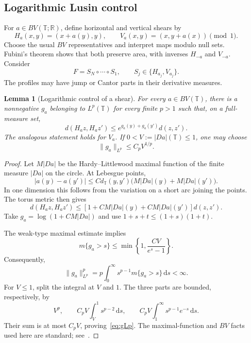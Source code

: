 \documentclass[review,12pt,times,a4paper,nopreprintline]{elsarticle}
\theoremstyle{plain}
\newtheorem{lemma}[theorem]{Lemma}
\theoremstyle{definition}
\theoremstyle{remark}
\newcommand{\T}{\mathbb T}
\newcommand{\R}{\mathbb R}
\newcommand{\dd}{\,\mathrm d}
\numberwithin{equation}{section}
\begin{document}
\subsection{Logarithmic Lusin control}
For $a\in BV(\T;\R)$, define horizontal and vertical shears by
\[
 H_a(x,y)=(x+a(y),y),\qquad
 V_a(x,y)=(x,y+a(x))\pmod1.
\]
Choose the usual $BV$ representatives and interpret maps modulo null sets. Fubini's theorem shows that both preserve area, with inverses $H_{-a}$ and $V_{-a}$. Consider
\[
 F=S_N\circ\cdots\circ S_1,\qquad
 S_j\in\{H_{a_j},V_{a_j}\}.
\]
The profiles may have jump or Cantor parts in their derivative measures.

\begin{lemma}[Logarithmic control of a shear]\label{lem:shearlusin}
For every $a\in BV(\T)$, there is a nonnegative $g_a$ belonging to $L^p(\T)$ for every finite $p>1$ such that, on a full-measure set,
\begin{equation}\label{eq:shearlusin}
 d(H_az,H_az')\leq e^{g_a(y)+g_a(y')}d(z,z').
\end{equation}
The analogous statement holds for $V_a$. If $0<V:=|Da|(\T)\leq1$, one may choose
\begin{equation}\label{eq:gLp}
 \|g_a\|_{L^p}\leq C_p V^{1/p}.
\end{equation}
\end{lemma}
\begin{proof}
Let $M|Da|$ be the Hardy--Littlewood maximal function of the finite measure $|Da|$ on the circle. At Lebesgue points,
\[
 |a(y)-a(y')|\leq C d_{\T}(y,y')
 \bigl(M|Da|(y)+M|Da|(y')\bigr).
\]
In one dimension this follows from the variation on a short arc joining the points. The torus metric then gives
\[
 d(H_az,H_az')\leq
 [1+C M|Da|(y)+C M|Da|(y')]d(z,z').
\]
Take $g_a=\log(1+C M|Da|)$ and use $1+s+t\leq(1+s)(1+t)$.

The weak-type maximal estimate implies
\begin{equation}\label{eq:gtail}
 m\{g_a>s\}\leq\min\left\{1,\frac{CV}{e^s-1}\right\}.
\end{equation}
Consequently,
\[
 \|g_a\|_{L^p}^p
 =p\int_0^\infty s^{p-1}m\{g_a>s\}\dd s<\infty.
\]
For $V\leq1$, split the integral at $V$ and $1$. The three parts are bounded, respectively, by
\[
 V^p,\qquad C_pV\int_V^1s^{p-2}\dd s,
 \qquad C_pV\int_1^\infty s^{p-1}e^{-s}\dd s.
\]
Their sum is at most $C_pV$, proving~\eqref{eq:gLp}. The maximal-function and $BV$ facts used here are standard; see~\cite{EvansGariepy}.
\end{proof}
\end{document}
